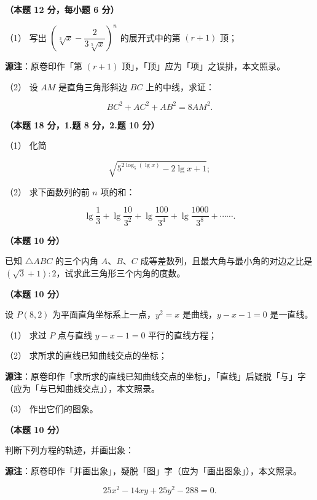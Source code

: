 \begin{question}
\textbf{（本题 12 分，每小题 6 分）} 

（1） 写出 $\left(\sqrt[3]{x}-\dfrac{2}{3\sqrt[5]{x}}\right)^n$ 的展开式中的第 $(r+1)$ 顶；

\begin{gktip}
\textbf{源注}：原卷印作「第 $(r+1)$ 顶」，「顶」应为「项」之误排，本文照录。
\end{gktip}

（2） 设 $AM$ 是直角三角形斜边 $BC$ 上的中线，求证：

\nopagebreak[4]
\[
BC^2+AC^2+AB^2=8AM^2.
\]

\end{question}
\begin{question}
\textbf{（本题 18 分，1.题 8 分，2.题 10 分）} 

（1） 化简

\nopagebreak[4]
\[
\sqrt{5^{2\log_5(\lg x)}-2\lg x+1};
\]

（2） 求下面数列的前 $n$ 项的和：

\nopagebreak[4]
\[
\lg\frac13+\lg\frac{10}{3^2}+\lg\frac{100}{3^4}+\lg\frac{1000}{3^8}+\cdots\cdots.
\]

\end{question}
\begin{question}
\textbf{（本题 10 分）} 

已知 $\triangle ABC$ 的三个内角 $A\text{、}B\text{、}C$ 成等差数列，且最大角与最小角的对边之比是 $(\sqrt3+1):2$，试求此三角形三个内角的度数。

\end{question}
\begin{question}
\textbf{（本题 10 分）} 

设 $P(8,2)$ 为平面直角坐标系上一点，$y^2=x$ 是曲线，$y-x-1=0$ 是一直线。

（1） 求过 $P$ 点与直线 $y-x-1=0$ 平行的直线方程；

（2） 求所求的直线已知曲线交点的坐标；

\begin{gktip}
\textbf{源注}：原卷印作「求所求的直线已知曲线交点的坐标」，「直线」后疑脱「与」字（应为「与已知曲线交点」），本文照录。
\end{gktip}

（3） 作出它们的图象。

\end{question}
\begin{question}
\textbf{（本题 10 分）} 

判断下列方程的轨迹，并画出象：

\begin{gktip}
\textbf{源注}：原卷印作「并画出象」，疑脱「图」字（应为「画出图象」），本文照录。
\end{gktip}

\nopagebreak[4]
\[
25x^2-14xy+25y^2-288=0.
\]

\Needspace{0.4\textheight}
\end{question}
